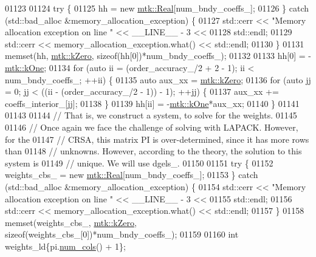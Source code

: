 \begin{DoxyCode}
{{01123 
01124   \textcolor{keywordflow}{try} \{
01125     hh = \textcolor{keyword}{new} \hyperlink{group__c01-roots_gac080bbbf5cbb5502c9f00405f894857d}{mtk::Real}[num\_bndy\_coeffs\_];
01126   \} \textcolor{keywordflow}{catch} (std::bad\_alloc &memory\_allocation\_exception) \{
01127     std::cerr << \textcolor{stringliteral}{"Memory allocation exception on line "} << \_\_LINE\_\_ - 3 <<
01128       std::endl;
01129     std::cerr << memory\_allocation\_exception.what() << std::endl;
01130   \}
01131   memset(hh, \hyperlink{group__c01-roots_ga59a451a5fae30d59649bcda274fea271}{mtk::kZero}, \textcolor{keyword}{sizeof}(hh[0])*num\_bndy\_coeffs\_);
01132 
01133   hh[0] = -\hyperlink{group__c01-roots_ga26407c24d43b6b95480943340d285c71}{mtk::kOne};
01134   \textcolor{keywordflow}{for} (\textcolor{keyword}{auto} ii = (order\_accuracy\_/2 + 2 - 1); ii < num\_bndy\_coeffs\_; ++ii) \{
01135     \textcolor{keyword}{auto} aux\_xx = \hyperlink{group__c01-roots_ga59a451a5fae30d59649bcda274fea271}{mtk::kZero};
01136     \textcolor{keywordflow}{for} (\textcolor{keyword}{auto} jj = 0; jj < ((ii - (order\_accuracy\_/2 - 1)) - 1); ++jj) \{
01137       aux\_xx += coeffs\_interior\_[jj];
01138     \}
01139     hh[ii] = -\hyperlink{group__c01-roots_ga26407c24d43b6b95480943340d285c71}{mtk::kOne}*aux\_xx;
01140   \}
01141 
01143 
01144   \textcolor{comment}{// That is, we construct a system, to solve for the weights.}
01145 
01146   \textcolor{comment}{// Once again we face the challenge of solving with LAPACK. However, for the}
01147   \textcolor{comment}{// CRSA, this matrix PI is over-determined, since it has more rows than}
01148   \textcolor{comment}{// unknowns. However, according to the theory, the solution to this system is}
01149   \textcolor{comment}{// unique. We will use dgels\_.}
01150 
01151   \textcolor{keywordflow}{try} \{
01152     weights\_cbs\_ = \textcolor{keyword}{new} \hyperlink{group__c01-roots_gac080bbbf5cbb5502c9f00405f894857d}{mtk::Real}[num\_bndy\_coeffs\_];
01153   \} \textcolor{keywordflow}{catch} (std::bad\_alloc &memory\_allocation\_exception) \{
01154     std::cerr << \textcolor{stringliteral}{"Memory allocation exception on line "} << \_\_LINE\_\_ - 3 <<
01155       std::endl;
01156     std::cerr << memory\_allocation\_exception.what() << std::endl;
01157   \}
01158   memset(weights\_cbs\_, \hyperlink{group__c01-roots_ga59a451a5fae30d59649bcda274fea271}{mtk::kZero}, \textcolor{keyword}{sizeof}(weights\_cbs\_[0])*num\_bndy\_coeffs\_);
01159 
01160   \textcolor{keywordtype}{int} weights\_ld\{pi.\hyperlink{classmtk_1_1DenseMatrix_a41747502d468c6728a4be31501b16e0e}{num\_cols}() + 1\};
}}
\end{DoxyCode}
